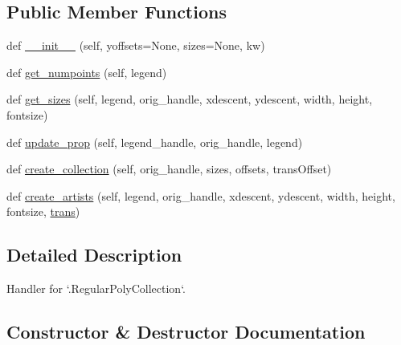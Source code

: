 \subsection*{Public Member Functions}
\begin{DoxyCompactItemize}
\item 
def \hyperlink{classmatplotlib_1_1legend__handler_1_1HandlerRegularPolyCollection_ac7d9ed7bc904eac0f18546819fad8423}{\+\_\+\+\_\+init\+\_\+\+\_\+} (self, yoffsets=None, sizes=None, kw)
\item 
def \hyperlink{classmatplotlib_1_1legend__handler_1_1HandlerRegularPolyCollection_a9c6108ea5e767dd56b02c79ef174201a}{get\+\_\+numpoints} (self, legend)
\item 
def \hyperlink{classmatplotlib_1_1legend__handler_1_1HandlerRegularPolyCollection_a583960d1a59f2fade9c15291dc688cb8}{get\+\_\+sizes} (self, legend, orig\+\_\+handle, xdescent, ydescent, width, height, fontsize)
\item 
def \hyperlink{classmatplotlib_1_1legend__handler_1_1HandlerRegularPolyCollection_a21cfd7bd85191a546f877dd7bc794b4d}{update\+\_\+prop} (self, legend\+\_\+handle, orig\+\_\+handle, legend)
\item 
def \hyperlink{classmatplotlib_1_1legend__handler_1_1HandlerRegularPolyCollection_abcc11393bd9d951abc25df025ec883ec}{create\+\_\+collection} (self, orig\+\_\+handle, sizes, offsets, trans\+Offset)
\item 
def \hyperlink{classmatplotlib_1_1legend__handler_1_1HandlerRegularPolyCollection_ac5193d87c40ea397fe4faa6e15ba43b0}{create\+\_\+artists} (self, legend, orig\+\_\+handle, xdescent, ydescent, width, height, fontsize, \hyperlink{size_2foo_8f90_afabfd8da71309850231a00e53c61f106}{trans})
\end{DoxyCompactItemize}


\subsection{Detailed Description}
\begin{DoxyVerb}Handler for `.RegularPolyCollection`\s.\end{DoxyVerb}
 

\subsection{Constructor \& Destructor Documentation}
\mbox{\label{classmatplotlib_1_1legend__handler_1_1HandlerRegularPolyCollection_ac7d9ed7bc904eac0f18546819fad8423}} 
